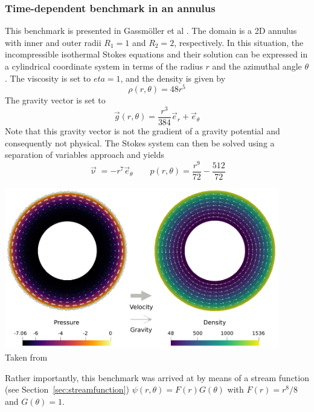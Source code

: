 \subsubsection{Time-dependent benchmark in an annulus}\label{sec:tdba}

This benchmark is presented in Gass{m\"o}ller et al \cite{galb19}.
The domain is a 2D annulus with inner and outer radii $R_1=1$ and $R_2=2$, respectively.
In this situation, the incompressible isothermal Stokes equations and their solution
can be expressed in a cylindrical coordinate system in terms of the radius $r$ and the
azimuthal angle $\theta$. The viscosity is set to $eta=1$, and the density is given by
\begin{equation}
\rho(r,\theta)=48r^5
\end{equation}
The gravity vector is set to 
\begin{equation}
\vec{g}(r,\theta)=\frac{r^3}{384} \vec{e}_r + \vec{e}_\theta
\end{equation}
Note that this gravity vector is not the gradient of a gravity potential
and consequently not physical.
The Stokes system can then be solved using a separation of variables
approach and yields
\begin{equation}
\vec{\upnu}=-r^7 \vec{e}_\theta
\quad\quad
p(r,\theta)=\frac{r^9}{72}-\frac{512}{72}
\end{equation}
\begin{center}
\includegraphics[width=12cm]{images/benchmark_annulus/galb19}\\
{\scriptsize Taken from \cite{galb19}}
\end{center}
Rather importantly, this benchmark was arrived at by means of a stream function (see Section~\ref{sec:streamfunction}) 
$\psi(r,\theta)=F(r)G(\theta)$ with $F(r)=r^8/8$ and $G(\theta)=1$.

